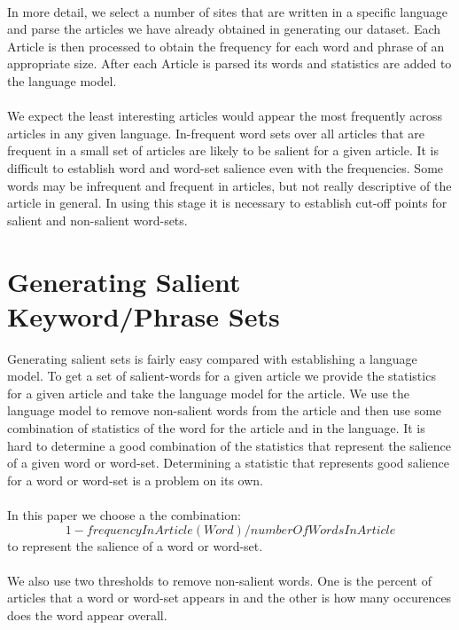 \documentclass[12pt]{article}
\begin{document}
\paragraph{}
In more detail, we select a number of sites that are written in a specific language and parse the articles
we have already obtained in generating our dataset. Each Article is then processed to obtain the frequency
for each word and phrase of an appropriate size. After each Article is parsed its words and statistics are
added to the language model.

\paragraph{}
We expect the least interesting articles would appear the most frequently across articles in any given 
language. In-frequent word sets over all articles that are frequent in a small set of articles are likely 
to be salient for a given article. It is difficult to establish word and word-set salience even with the 
frequencies. Some words may be infrequent and frequent in articles, but not really descriptive of the 
article in general. In using this stage it is necessary to establish cut-off points for salient and 
non-salient word-sets.

\section{Generating Salient Keyword/Phrase Sets}
Generating salient sets is fairly easy compared with establishing a language model. To get a set of 
salient-words for a given article we provide the statistics for a given article and take the language 
model for the article. We use the language model to remove non-salient words from the article and then 
use some combination of statistics of the word for the article and in the language. It is hard to
determine a good combination of the statistics that represent the salience of a given word or word-set. 
Determining a statistic that represents good salience for a word or word-set is a problem on its own.
\paragraph{}
In this paper we choose a the combination:
$$1-frequencyInArticle(Word)/numberOfWordsInArticle$$
to represent the salience of a word or word-set.
\paragraph{}
We also use two thresholds to remove non-salient words. One is the percent of articles that a word or
word-set appears in and the other is how many occurences does the word appear overall.
\end{document}
